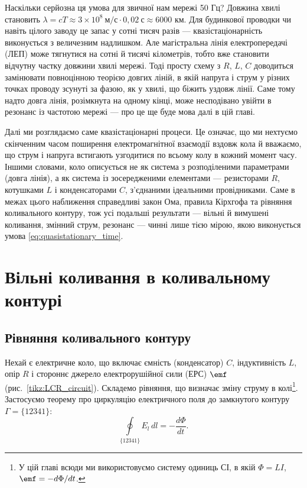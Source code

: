 \begin{Attention}
	Наскільки серйозна ця умова для звичної нам мережі 50 Гц? Довжина хвилі становить $\lambda = cT \approx 3\times10^{8}\ \text{м/с}\cdot 0{,}02\ \text{с} \approx 6000$ км. Для будинкової проводки чи навіть цілого заводу це запас у сотні тисяч разів --- квазістаціонарність виконується з величезним надлишком. Але магістральна лінія електропередачі (ЛЕП) може тягнутися на сотні й тисячі кілометрів, тобто вже становити відчутну частку довжини хвилі мережі. Тоді просту схему з $R$, $L$, $C$ доводиться замінювати повноцінною теорією довгих ліній, в якій напруга і струм у різних точках проводу зсунуті за фазою, як у хвилі, що біжить уздовж лінії. Саме тому надто довга лінія, розімкнута на одному кінці, може несподівано увійти в резонанс із частотою мережі --- про це ще буде мова далі в цій главі.
\end{Attention}

Далі ми розглядаємо саме квазістаціонарні процеси. Це означає, що ми нехтуємо скінченним часом поширення електромагнітної взаємодії вздовж кола й вважаємо, що струм і напруга встигають узгодитися по всьому колу в кожний момент часу. Іншими словами, коло описується не як система з розподіленими параметрами (довга лінія), а як система із зосередженими елементами --- резисторами $R$, котушками $L$ і конденсаторами $C$, з'єднаними ідеальними провідниками. Саме в межах цього наближення справедливі закон Ома, правила Кірхгофа та рівняння коливального контуру, тож усі подальші результати --- вільні й вимушені коливання, змінний струм, резонанс --- чинні лише тією мірою, якою виконується умова \eqref{eq:quasistationary_time}.

\section{Вільні коливання в коливальному контурі}\hypertarget{free-oscillations}{}

\subsection*{Рівняння коливального контуру}

Нехай є електричне коло, що включає ємність (конденсатор) $C$, індуктивність $L$, опір $R$ і стороннє джерело електрорушійної сили (ЕРС) $\emf$ (рис.~\ref{tikz:LCR_circuit}). Складемо рівняння, що визначає зміну струму в колі\footnote{У цій главі всюди ми використовуємо систему одиниць СІ, в якій $\Phi = LI$, $\emf = -d\Phi/dt$.}. Застосуємо теорему про циркуляцію електричного поля до замкнутого контуру $\Gamma = \{12341\}$:
\begin{equation}\label{eq:circulation}
	\oint\limits_{\{12341\}} E_l \, dl = -\frac{d\Phi}{dt}.
\end{equation}

